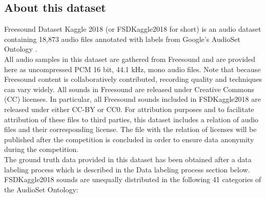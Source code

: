 \documentclass{article} %
\begin{document}
	\subsection{About this dataset}
		Freesound Dataset Kaggle 2018 (or FSDKaggle2018 for short) is an audio dataset containing 18,873 audio files annotated with labels from Google's AudioSet Ontology \cite{cite6}.\\
		\newline
		All audio samples in this dataset are gathered from Freesound \cite{cite7} and are provided here as uncompressed PCM 16 bit, 44.1 kHz, mono audio files. Note that because Freesound content is collaboratively contributed, recording quality and techniques can vary widely. All sounds in Freesound are released under Creative Commons (CC) licenses. In particular, all Freesound sounds included in FSDKaggle2018 are released under either CC-BY or CC0. For attribution purposes and to facilitate attribution of these files to third parties, this dataset includes a relation of audio files and their corresponding license. The file with the relation of licenses will be published after the competition is concluded in order to ensure data anonymity during the competition.\\
		\newline
		The ground truth data provided in this dataset has been obtained after a data labeling process which is described in the Data labeling process section below. FSDKaggle2018 sounds are unequally distributed in the following 41 categories of the AudioSet Ontology:\\
\end{document}

